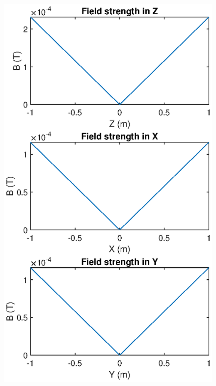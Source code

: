 \documentclass{article}
\theoremstyle{definition}
\begin{document}
\begin{figure}[!htb]
\begin{minipage}{.33\textwidth}
		\includegraphics[width=\linewidth]{sim-figs/quad-3.eps}
	\end{minipage}%
\end{figure}
\end{document}
